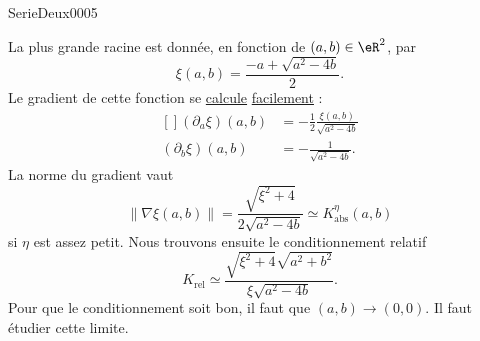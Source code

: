 
\begin{corrige}{SerieDeux0005}

	La plus grande racine est donnée, en fonction de $(a,b)\in\eR^2$, par
	\begin{equation}
		\xi(a,b)=\frac{ -a+\sqrt{a^2-4b} }{2}.
	\end{equation}
	Le gradient de cette fonction se \href{http://www.sagemath.org}{calcule} \href{http://www.sagemath.org/doc/reference/sage/plot/plot_field.html}{facilement} :
	\begin{equation}
		\begin{aligned}[]
			(\partial_a\xi)(a,b)&=-\frac{ 1 }{2}\frac{ \xi(a,b) }{ \sqrt{a^2-4b} }\\
			(\partial_b\xi)(a,b)&=-\frac{1}{ \sqrt{a^2-4b} }.
		\end{aligned}
	\end{equation}
	La norme du gradient vaut
	\begin{equation}
		\| \nabla\xi(a,b) \|=\frac{ \sqrt{\xi^2+4} }{ 2\sqrt{a^2-4b} }\simeq K^{\eta}_{\text{abs}}(a,b)
	\end{equation}
	si $\eta$ est assez petit. Nous trouvons ensuite le conditionnement relatif
	\begin{equation}
		K_{\text{rel}}\simeq \frac{    \sqrt{\xi^2+4}\sqrt{a^2+b^2}    }{ \xi\sqrt{a^2-4b} }.
	\end{equation}
	Pour que le conditionnement soit bon, il faut que $(a,b)\to(0,0)$. Il faut étudier cette limite.

\end{corrige}
